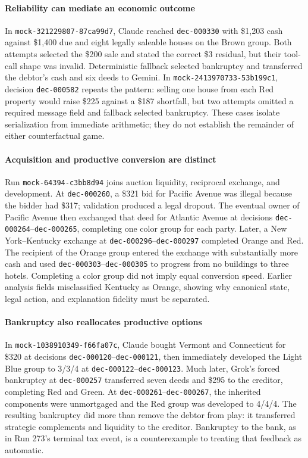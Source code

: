 \documentclass[conference]{IEEEtran}
\newcommand{\runid}[1]{\nolinkurl{#1}}
\begin{document}
\paragraph{Reliability can mediate an economic outcome}
In \runid{mock-321229807-87ca99d7}, Claude reached
\runid{dec-000330} with \$1,203 cash against \$1,400 due and eight legally
saleable houses on the Brown group. Both attempts selected the \$200 sale and stated
the correct \$3 residual, but their tool-call shape was invalid. Deterministic
fallback selected bankruptcy and transferred the debtor's cash and six deeds
to Gemini. In \runid{mock-2413970733-53b199c1}, decision
\runid{dec-000582} repeats the pattern: selling one house from each Red
property would
raise \$225 against a \$187 shortfall, but two attempts omitted a required
message field and fallback selected bankruptcy. These cases isolate
serialization from immediate arithmetic; they do not establish the remainder
of either counterfactual game.

\paragraph{Acquisition and productive conversion are distinct}
Run \runid{mock-64394-c3bb8d94} joins auction liquidity, reciprocal exchange,
and development. At \runid{dec-000260}, a \$321 bid for Pacific Avenue was
illegal because the bidder had \$317; validation produced a legal dropout. The
eventual owner of Pacific Avenue then exchanged that deed for Atlantic Avenue
at decisions \runid{dec-000264}--\runid{dec-000265}, completing one color group
for each party. Later, a New York--Kentucky exchange at
\runid{dec-000296}--\runid{dec-000297} completed Orange and Red. The recipient
of the Orange group entered the exchange with substantially more cash and used
\runid{dec-000303}--\runid{dec-000305} to progress from no buildings to three
hotels. Completing a color group did not imply equal conversion speed. Earlier
analysis fields misclassified Kentucky as Orange, showing why
canonical state, legal action, and explanation fidelity must be separated.

\paragraph{Bankruptcy also reallocates productive options}
In \runid{mock-1038910349-f66fa07c}, Claude bought Vermont and Connecticut for
\$320 at decisions \runid{dec-000120}--\runid{dec-000121}, then immediately
developed the Light Blue group to 3/3/4 at
\runid{dec-000122}--\runid{dec-000123}. Much
later, Grok's forced bankruptcy at \runid{dec-000257} transferred seven deeds
and \$295 to the creditor, completing Red and Green. At
\runid{dec-000261}--\runid{dec-000267}, the inherited components were
unmortgaged and the Red group was developed to 4/4/4. The resulting bankruptcy
did more than remove the debtor from play: it transferred strategic
complements and liquidity to the creditor. Bankruptcy to the bank, as in Run
273's terminal tax event, is a counterexample to treating that feedback as
automatic.
\end{document}
